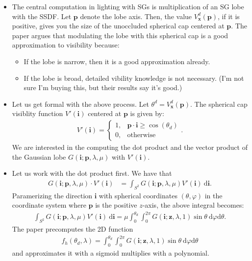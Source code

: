 \documentclass[10pt]{article}
\newcommand{\dee}{\mathrm{d}}
\newcommand{\ve}[1]{\mathbf{#1}}
\begin{document}
\begin{itemize}
    \item The central computation in lighting with SGs is multiplication of an SG lobe with the SSDF.  Let $\ve{p}$ denote the lobe axis.  Then, the value $V_{\ve{x}}^d(\ve{p})$, if it is positive, gives you the size of the unoccluded spherical cap centered at $\ve{p}$.  The paper argues that modulating the lobe with this spherical cap is a good approximation to visibility because:
    \begin{itemize}
      \item If the lobe is narrow, then it is a good approximation already.
      \item If the lobe is broad, detailed vibility knowledge is not necessary.  (I'm not sure I'm buying this, but their results say it's good.)
    \end{itemize}

    \item Let us get formal with the above process.  Let $\theta^d = V^d_\ve{x}(\ve{p})$.  The spherical cap visiblity function $V'(\ve{i})$ centered at $\ve{p}$ is given by:
    \begin{align*}
      V'(\ve{i}) = \begin{cases}
        1, & \ve{p}\cdot \ve{i} \geq \cos(\theta_d) \\
        0, & \mbox{otherwise}
      \end{cases}.
    \end{align*}
    We are interested in the computing the dot product and the vector product of the Gaussian lobe $G(\ve{i}; \ve{p}, \lambda, \mu)$ with $V'(\ve{i})$.

    \item Let us work with the dot product first.  We have that
    \begin{align*}
      G(\ve{i}; \ve{p}, \lambda, \mu) \cdot V'(\ve{i})
      &= \int_{S^2} G(\ve{i}; \ve{p}, \lambda, \mu) V'(\ve{i})\ \dee\ve{i}.
    \end{align*}
    Paramerizing the direction $\ve{i}$ with spherical coordinates $(\theta,\varphi)$ in the coordinate system where $\ve{p}$ is the positive $z$-axis, the above integral becomes:
    \begin{align*}
      \int_{S^2} G(\ve{i}; \ve{p}, \lambda, \mu) V'(\ve{i})\ \dee\ve{i}
      = \mu \int_{0}^{\theta_d} \int_{0}^{2\pi} G(\ve{i}; \ve{z}, \lambda, 1) \sin\theta\ \dee\varphi \dee\theta .
    \end{align*}
    The paper precomputes the 2D function 
    \begin{align*}
      f_h(\theta_d, \lambda) = \int_{0}^{\theta_d} \int_{0}^{2\pi} G(\ve{i}; \ve{z}, \lambda, 1) \sin\theta\ \dee\varphi \dee\theta
    \end{align*}
    and approximates it with a sigmoid multiplies with a polynomial.


\end{itemize}
\end{document}
